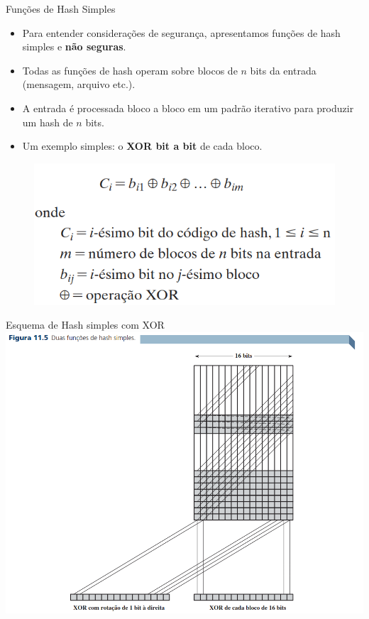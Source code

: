 \begin{frame}{Funções de Hash Simples}
    \begin{itemize}
        \item Para entender considerações de segurança, apresentamos funções de hash simples e \textbf{não seguras}.
        \item Todas as funções de hash operam sobre blocos de $n$ bits da entrada (mensagem, arquivo etc.).
        \item A entrada é processada bloco a bloco em um padrão iterativo para produzir um hash de $n$ bits.
        \item Um exemplo simples: o \textbf{XOR bit a bit} de cada bloco.

    \end{itemize}
    \begin{figure}
        \centering
        \includegraphics[width=0.5\linewidth]{Figuras/funcao-hash-simples.png}

    \end{figure}

\end{frame}




\begin{frame}{Esquema de Hash simples com XOR}
    \centering
    \includegraphics[width=0.65\linewidth]{Figuras/hash-simples-xor.png}
\end{frame}

